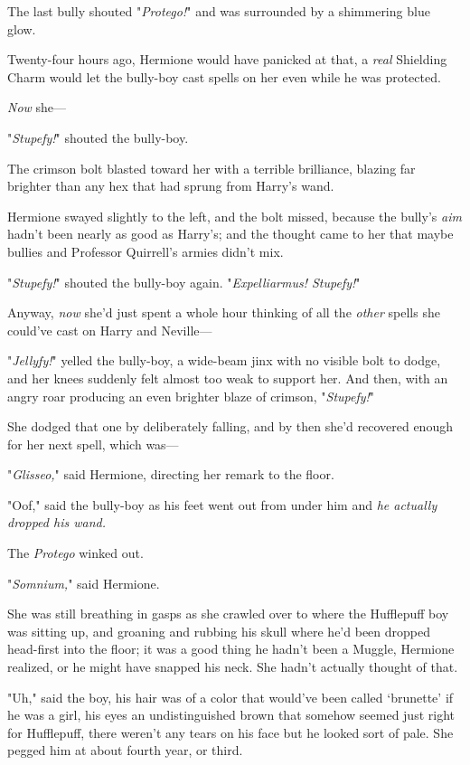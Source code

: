 The last bully shouted "\emph{Protego!}" and was surrounded by a shimmering
blue glow.

Twenty-four hours ago, Hermione would have panicked at that, a \emph{real}
Shielding Charm would let the bully-boy cast spells on her even while he was
protected.

\emph{Now} she---

"\emph{Stupefy!}" shouted the bully-boy.

The crimson bolt blasted toward her with a terrible brilliance, blazing far
brighter than any hex that had sprung from Harry's wand.

Hermione swayed slightly to the left, and the bolt missed, because the bully's
\emph{aim} hadn't been nearly as good as Harry's; and the thought came to her
that maybe bullies and Professor Quirrell's armies didn't mix.

"\emph{Stupefy!}" shouted the bully-boy again. "\emph{Expelliarmus! Stupefy!}"

Anyway, \emph{now} she'd just spent a whole hour thinking of all the
\emph{other} spells she could've cast on Harry and Neville---

"\emph{Jellyfy!}" yelled the bully-boy, a wide-beam jinx with no visible bolt
to dodge, and her knees suddenly felt almost too weak to support her. And then,
with an angry roar producing an even brighter blaze of crimson,
"\emph{Stupefy!}"

She dodged that one by deliberately falling, and by then she'd recovered enough
for her next spell, which was---

"\emph{Glisseo,}" said Hermione, directing her remark to the floor.

"Oof," said the bully-boy as his feet went out from under him and \emph{he
actually dropped his wand.}

The \emph{Protego} winked out.

"\emph{Somnium,}" said Hermione.

She was still breathing in gasps as she crawled over to where the Hufflepuff
boy was sitting up, and groaning and rubbing his skull where he'd been dropped
head-first into the floor; it was a good thing he hadn't been a Muggle,
Hermione realized, or he might have snapped his neck. She hadn't actually
thought of that.

"Uh," said the boy, his hair was of a color that would've been called
`brunette' if he was a girl, his eyes an undistinguished brown that somehow
seemed just right for Hufflepuff, there weren't any tears on his face but he
looked sort of pale. She pegged him at about fourth year, or third.

